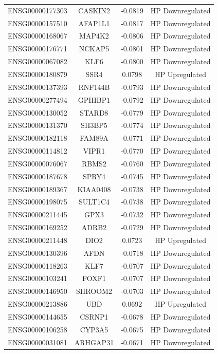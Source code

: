 \documentclass[
]{article}
\begin{document}
\begin{singlespace}
\begin{longtable}[t]{lccc}
ENSG00000177303 & CASKIN2 & -0.0819 & HP Downregulated\\
ENSG00000157510 & AFAP1L1 & -0.0817 & HP Downregulated\\
ENSG00000168067 & MAP4K2 & -0.0806 & HP Downregulated\\
\addlinespace
ENSG00000176771 & NCKAP5 & -0.0801 & HP Downregulated\\
ENSG00000067082 & KLF6 & -0.0800 & HP Downregulated\\
ENSG00000180879 & SSR4 & 0.0798 & HP Upregulated\\
ENSG00000137393 & RNF144B & -0.0793 & HP Downregulated\\
ENSG00000277494 & GPIHBP1 & -0.0792 & HP Downregulated\\
\addlinespace
ENSG00000130052 & STARD8 & -0.0779 & HP Downregulated\\
ENSG00000131370 & SH3BP5 & -0.0774 & HP Downregulated\\
ENSG00000182118 & FAM89A & -0.0771 & HP Downregulated\\
ENSG00000114812 & VIPR1 & -0.0770 & HP Downregulated\\
ENSG00000076067 & RBMS2 & -0.0760 & HP Downregulated\\
\addlinespace
ENSG00000187678 & SPRY4 & -0.0745 & HP Downregulated\\
ENSG00000189367 & KIAA0408 & -0.0738 & HP Downregulated\\
ENSG00000198075 & SULT1C4 & -0.0738 & HP Downregulated\\
ENSG00000211445 & GPX3 & -0.0732 & HP Downregulated\\
ENSG00000169252 & ADRB2 & -0.0729 & HP Downregulated\\
\addlinespace
ENSG00000211448 & DIO2 & 0.0723 & HP Upregulated\\
ENSG00000130396 & AFDN & -0.0718 & HP Downregulated\\
ENSG00000118263 & KLF7 & -0.0707 & HP Downregulated\\
ENSG00000103241 & FOXF1 & -0.0707 & HP Downregulated\\
ENSG00000146950 & SHROOM2 & -0.0703 & HP Downregulated\\
\addlinespace
ENSG00000213886 & UBD & 0.0692 & HP Upregulated\\
ENSG00000144655 & CSRNP1 & -0.0678 & HP Downregulated\\
ENSG00000106258 & CYP3A5 & -0.0675 & HP Downregulated\\
ENSG00000031081 & ARHGAP31 & -0.0671 & HP Downregulated\\

\end{longtable}
\end{singlespace}
\end{document}
